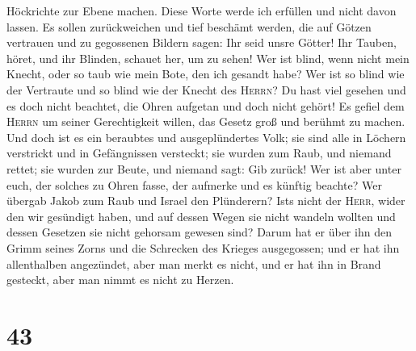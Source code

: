 Höckrichte zur Ebene machen. Diese Worte werde ich erfüllen und nicht
davon lassen.  Es sollen zurückweichen und tief beschämt
werden, die auf Götzen vertrauen und zu gegossenen Bildern sagen: Ihr
seid unsre Götter!  Ihr Tauben, höret, und ihr Blinden,
schauet her, um zu sehen!  Wer ist blind, wenn nicht mein
Knecht, oder so taub wie mein Bote, den ich gesandt habe? Wer ist so
blind wie der Vertraute und so blind wie der Knecht des \textsc{Herrn}?
 Du hast viel gesehen und es doch nicht beachtet, die
Ohren aufgetan und doch nicht gehört!  Es gefiel dem
\textsc{Herrn} um seiner Gerechtigkeit willen, das Gesetz groß und
berühmt zu machen.  Und doch ist es ein beraubtes und
ausgeplündertes Volk; sie sind alle in Löchern verstrickt und in
Gefängnissen versteckt; sie wurden zum Raub, und niemand rettet; sie
wurden zur Beute, und niemand sagt: Gib zurück!  Wer ist
aber unter euch, der solches zu Ohren fasse, der aufmerke und es künftig
beachte?  Wer übergab Jakob zum Raub und Israel den
Plünderern? Ist\textquotesingle s nicht der \textsc{Herr}, wider den wir
gesündigt haben, und auf dessen Wegen sie nicht wandeln wollten und
dessen Gesetzen sie nicht gehorsam gewesen sind?  Darum
hat er über ihn den Grimm seines Zorns und die Schrecken des Krieges
ausgegossen; und er hat ihn allenthalben angezündet, aber man merkt es
nicht, und er hat ihn in Brand gesteckt, aber man nimmt es nicht zu
Herzen.

\hypertarget{section-42}{%
\section{43}\label{section-42}}

